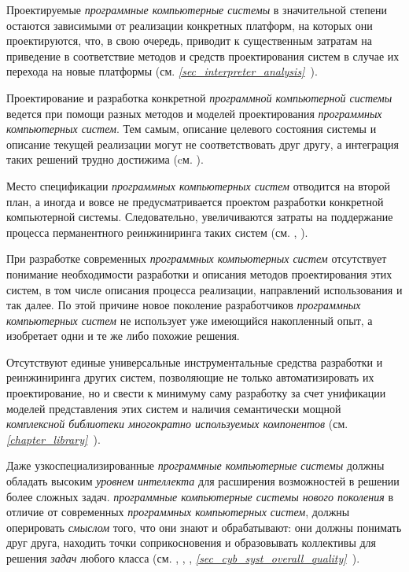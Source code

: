 \begin{textitemize}
   \item Проектируемые \textit{программные компьютерные системы} в значительной степени остаются зависимыми от реализации конкретных платформ, на которых они проектируются, что, в свою очередь, приводит к существенным затратам на приведение в соответствие методов и средств проектирования систем в случае их перехода на новые платформы (см. \textit{\ref{sec_interpreter_analysis}~}).
   \item Проектирование и разработка конкретной \textit{программной компьютерной системы} ведется при помощи разных методов и моделей проектирования \textit{программных компьютерных систем}. Тем самым, описание целевого состояния системы и описание текущей реализации могут не соответствовать друг другу, а интеграция таких решений трудно достижима (cм. ).
   \item Место спецификации \textit{программных компьютерных систем} отводится на второй план, а иногда и вовсе не предусматривается проектом разработки конкретной компьютерной системы. Следовательно, увеличиваются затраты на поддержание процесса перманентного реинжиниринга таких систем (см. , ).
   \item При разработке современных \textit{программных компьютерных систем} отсутствует понимание необходимости разработки и описания методов проектирования этих систем, в том числе описания процесса реализации, направлений использования и так далее. По этой причине новое поколение разработчиков \textit{программных компьютерных систем} не использует уже имеющийся накопленный опыт, а изобретает одни и те же либо похожие решения.
   \item Отсутствуют единые универсальные инструментальные средства разработки и реинжиниринга других систем, позволяющие не только автоматизировать их проектирование, но и свести к минимуму саму разработку за счет унификации моделей представления этих систем и наличия семантически мощной \textit{комплексной библиотеки многократно используемых компонентов} (см. \textit{\ref{chapter_library}~}).
   \item Даже узкоспециализированные \textit{программные компьютерные системы} должны обладать высоким \textit{уровнем интеллекта} для расширения возможностей в решении более сложных задач. \textit{программные компьютерные системы нового поколения} в отличие от современных \textit{программных компьютерных систем}, должны оперировать \textit{смыслом} того, что они знают и обрабатывают: они должны понимать друг друга, находить точки соприкосновения и образовывать коллективы для решения \textit{задач} любого класса (см. , , , \textit{\ref{sec_cyb_syst_overall_quality}~}).

\end{textitemize}
